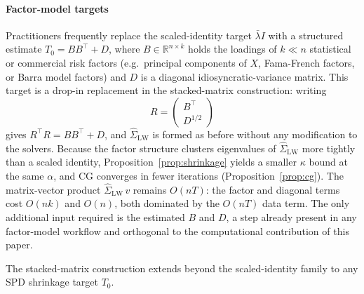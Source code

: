 \paragraph{Factor-model targets}
Practitioners frequently replace the scaled-identity target $\bar\lambda I$ with a structured estimate
$T_0 = B B^\top + D$, where $B \in \mathbb{R}^{n \times k}$ holds the loadings of
$k \ll n$ statistical or commercial risk factors (e.g.\ principal components of $X$,
Fama-French factors, or Barra model factors) and $D$ is a diagonal idiosyncratic-variance
matrix. This target is a drop-in replacement in the stacked-matrix construction: writing
\[
  R = \begin{pmatrix} B^\top \\ D^{1/2} \end{pmatrix}
\]
gives $R^\top R = B B^\top + D$, and $\hat\Sigma_{\mathrm{LW}}$ is formed as before
without any modification to the solvers. Because the factor structure clusters
eigenvalues of $\hat\Sigma_{\mathrm{LW}}$ more tightly than a scaled identity,
Proposition~\ref{prop:shrinkage} yields a smaller $\kappa$ bound at the same $\alpha$,
and CG converges in fewer iterations (Proposition~\ref{prop:cg}). The matrix-vector
product $\hat\Sigma_{\mathrm{LW}}\,v$ remains $O(nT)$: the factor and diagonal terms
cost $O(nk)$ and $O(n)$, both dominated by the $O(nT)$ data term. The only additional
input required is the estimated $B$ and $D$, a step already present in any
factor-model workflow and orthogonal to the computational contribution of this paper.

The stacked-matrix construction extends beyond the scaled-identity family to any
SPD shrinkage target $T_0$.
